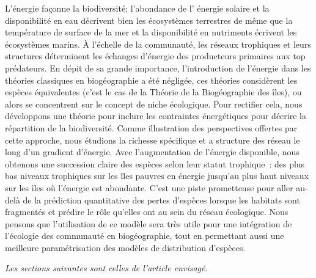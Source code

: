 L’énergie façonne la biodiversité; l’abondance de l’
énergie solaire et la disponibilité en eau décrivent bien les écosystèmes
terrestres de même que la température de surface de la mer et la disponibilité
en nutriments écrivent les écosystèmes marins. À l'échelle de la communauté,
les réseaux trophiques et leurs structures déterminent les échanges d'énergie
des producteurs primaires aux top prédateurs. En dépit de sa grande importance,
l'introduction de l'énergie dans les théories classiques en biogéographie a été
négligée, ces théories considèrent les espèces équivalentes (c'est le cas de la
Théorie de la Biogéographie des îles), ou alors se concentrent sur le concept de niche
écologique. Pour rectifier cela, nous développons une théorie pour inclure
les contraintes énergétiques pour décrire la répartition de la biodiversité.
Comme illustration des perspectives offertes par cette approche, nous étudions
la richesse spécifique et a structure des réseau le long d'un gradient
d'énergie. Avec l'augmentation de l'énergie disponible, nous obtenons une succession claire
des espèces selon leur statut trophique~: des plus bas niveaux trophiques sur
les îles pauvres en énergie jusqu'au plus haut niveaux sur les îles où l'énergie
est abondante. C'est une piste prometteuse pour aller au-delà de la prédiction quantitative
des pertes d’espèces lorsque les habitats sont fragmentés et prédire le rôle qu'elles
ont au sein du réseau écologique. Nous pensons que l'utilisation de ce modèle
sera très utile pour une intégration de l'écologie des communauté en biogéographie,
tout en permettant aussi une meilleure paramétrisation des modèles de distribution
d'espèces.



\emph{Les sections suivantes sont celles de l'article envisagé.}
